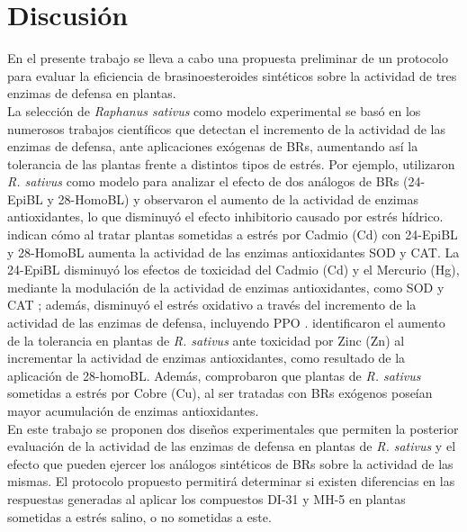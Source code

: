  
\chapter{Discusión}
\label{discus}

En el presente trabajo se lleva a cabo una propuesta preliminar de un protocolo para evaluar la eficiencia de brasinoesteroides sint\'eticos sobre la actividad de tres enzimas de defensa en plantas.  \\ 

La selecci\'on de \textit{Raphanus sativus} como modelo experimental se bas\'o en los numerosos trabajos cient\'ificos que detectan el incremento de la actividad de las enzimas de defensa, ante aplicaciones ex\'ogenas de BRs, aumentando as\'i la tolerancia de las plantas frente a distintos tipos de estr\'es. Por ejemplo, \cite{mahesh2013effect} utilizaron \textit{R. sativus} como modelo para analizar el efecto de dos an\'alogos de BRs (24-EpiBL y 28-HomoBL) y observaron el aumento de la actividad de enzimas antioxidantes, lo que disminuy\'o el efecto inhibitorio causado por estr\'es h\'idrico. \cite{anuradha2007effect} indican c\'omo al tratar plantas sometidas a estr\'es por Cadmio (Cd) con 24-EpiBL y 28-HomoBL aumenta la actividad de las enzimas antioxidantes SOD y CAT. La 24-EpiBL disminuy\'o los efectos de toxicidad del Cadmio (Cd) y el Mercurio (Hg), mediante la modulaci\'on de la actividad de enzimas antioxidantes, como SOD y CAT \citep{dhriti201424}; adem\'as, disminuy\'o el estr\'es oxidativo a trav\'es del incremento de la actividad de las enzimas de defensa, incluyendo PPO \citep{sharma2012effect}. \cite{ramakrishna2013preliminary} identificaron el aumento de la tolerancia en plantas de \textit{R. sativus} ante toxicidad por Zinc (Zn) al incrementar la actividad de enzimas antioxidantes, como resultado de la aplicaci\'on de 28-homoBL. Adem\'as, \cite{choudhary2012chromium} comprobaron que plantas de \textit{R. sativus} sometidas a estr\'es por Cobre (Cu), al ser tratadas con BRs ex\'ogenos pose\'ian mayor acumulaci\'on de enzimas antioxidantes.\\

En este trabajo se proponen dos dise\~nos experimentales que permiten la posterior evaluaci\'on de la actividad de las enzimas de defensa en plantas de \textit{R. sativus} y el efecto que pueden ejercer los an\'alogos sint\'eticos de BRs sobre la  actividad de las mismas. El protocolo propuesto permitir\'a determinar si existen diferencias en las respuestas generadas al aplicar los compuestos DI-31 y MH-5 en plantas sometidas a estr\'es salino, o no sometidas a este. \\

